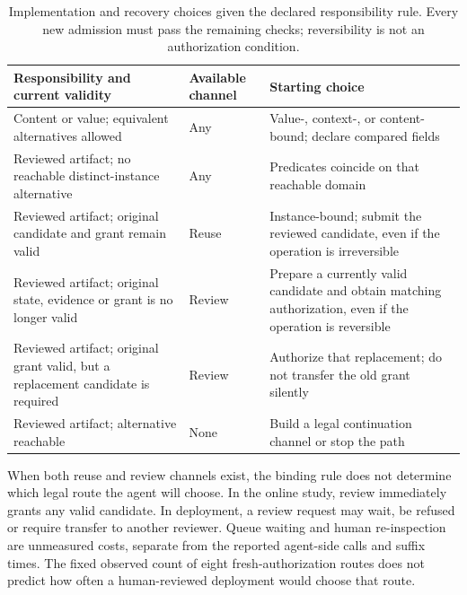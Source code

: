 \begin{table}[htbp]
\centering\small
\caption{Implementation and recovery choices given the declared responsibility rule. Every new admission must pass the remaining checks; reversibility is not an authorization condition.}
\label{tab:appendix-design-selection}
\begin{tabularx}{\textwidth}{@{}>{\raggedright\arraybackslash}p{}>{\raggedright\arraybackslash}p{}>{\raggedright\arraybackslash}X@{}}
\toprule
Responsibility and current validity & Available channel & Starting choice\\
\midrule
Content or value; equivalent alternatives allowed & Any & Value-, context-, or content-bound; declare compared fields\\
Reviewed artifact; no reachable distinct-instance alternative & Any & Predicates coincide on that reachable domain\\
Reviewed artifact; original candidate and grant remain valid & Reuse & Instance-bound; submit the reviewed candidate, even if the operation is irreversible\\
Reviewed artifact; original state, evidence or grant is no longer valid & Review & Prepare a currently valid candidate and obtain matching authorization, even if the operation is reversible\\
Reviewed artifact; original grant valid, but a replacement candidate is required & Review & Authorize that replacement; do not transfer the old grant silently\\
Reviewed artifact; alternative reachable & None & Build a legal continuation channel or stop the path\\
\bottomrule
\end{tabularx}
\end{table}

When both reuse and review channels exist, the binding rule does not determine which legal route the agent will choose. In the online study, review immediately grants any valid candidate. In deployment, a review request may wait, be refused or require transfer to another reviewer. Queue waiting and human re-inspection are unmeasured costs, separate from the reported agent-side calls and suffix times. The fixed observed count of eight fresh-authorization routes does not predict how often a human-reviewed deployment would choose that route.

